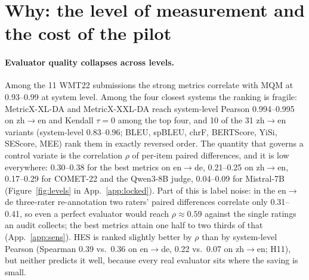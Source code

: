 \documentclass[11pt]{article}
\begin{document}
\section{Why: the level of measurement and the cost of the pilot}\label{sec:why}
\paragraph{Evaluator quality collapses across levels.} Among the 11 WMT22 submissions the strong metrics correlate with
MQM at 0.93--0.99 at system level. Among the four closest systems the ranking is fragile: MetricX-XL-DA and
MetricX-XXL-DA reach system-level Pearson 0.994--0.995 on zh$\to$en and Kendall $\tau=0$ among the top four, and 10 of
the 31 zh$\to$en variants (system-level 0.83--0.96; BLEU, spBLEU, chrF, BERTScore, YiSi, SEScore, MEE) rank them in
exactly reversed order. The quantity that governs a control variate is the correlation $\rho$ of per-item paired
differences, and it is low everywhere: 0.30--0.38 for the best metrics on en$\to$de, 0.21--0.25 on zh$\to$en, 0.17--0.29
for COMET-22 and the Qwen3-8B judge, 0.04--0.09 for Mistral-7B (Figure~\ref{fig:levels} in App.~\ref{app:locked}).
Part of this is label noise: in the en$\to$de three-rater re-annotation two raters' paired differences correlate only
0.31--0.41, so even a perfect evaluator would reach $\rho\approx0.59$ against the single ratings an audit collects; the
best metrics attain one half to two thirds of that (App.~\ref{app:sens}). HES is ranked slightly better by $\rho$ than
by system-level Pearson (Spearman 0.39 vs.\ 0.36 on en$\to$de, 0.22 vs.\ 0.07 on zh$\to$en; H11), but neither predicts
it well, because every real evaluator sits where the saving is small.
\end{document}
